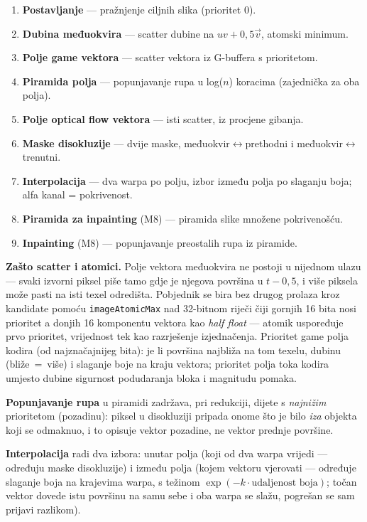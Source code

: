 \documentclass{mathos}
\begin{document}
\begin{enumerate}
\item \textbf{Postavljanje} — pražnjenje ciljnih slika (prioritet 0).
\item \textbf{Dubina međuokvira} — scatter dubine na $uv+0,5\vec v$, atomski minimum.
\item \textbf{Polje game vektora} — scatter vektora iz G-buffera s prioritetom.
\item \textbf{Piramida polja} — popunjavanje rupa u log($n$) koracima (zajednička za oba polja).
\item \textbf{Polje optical flow vektora} — isti scatter, iz procjene gibanja.
\item \textbf{Maske disokluzije} — dvije maske, međuokvir$\leftrightarrow$prethodni i međuokvir$\leftrightarrow$trenutni.
\item \textbf{Interpolacija} — dva warpa po polju, izbor između polja po slaganju boja; alfa kanal = pokrivenost.
\item \textbf{Piramida za inpainting} (M8) — piramida slike množene pokrivenošću.
\item \textbf{Inpainting} (M8) — popunjavanje preostalih rupa iz piramide.
\end{enumerate}

\textbf{Zašto scatter i atomici.} Polje vektora međuokvira ne postoji u
nijednom ulazu — svaki izvorni piksel piše tamo gdje je njegova površina u
$t-0,5$, i više piksela može pasti na isti texel odredišta. Pobjednik se bira
bez drugog prolaza kroz kandidate pomoću \verb+imageAtomicMax+ nad
32-bitnom riječi čiji gornjih 16 bita nosi prioritet a donjih 16 komponentu
vektora kao \emph{half float} — atomik uspoređuje prvo prioritet, vrijednost
tek kao razrješenje izjednačenja. Prioritet game polja kodira (od
najznačajnijeg bita): je li površina najbliža na tom texelu, dubinu
(bliže~=~više) i slaganje boje na kraju vektora; prioritet polja toka kodira
umjesto dubine sigurnost podudaranja bloka i magnitudu pomaka.

\textbf{Popunjavanje rupa} u piramidi zadržava, pri redukciji, dijete s
\emph{najnižim} prioritetom (pozadinu): piksel u disokluziji pripada onome
što je bilo \emph{iza} objekta koji se odmaknuo, i to opisuje vektor
pozadine, ne vektor prednje površine.

\textbf{Interpolacija} radi dva izbora: unutar polja (koji od dva warpa
vrijedi — određuju maske disokluzije) i između polja (kojem vektoru
vjerovati — određuje slaganje boja na krajevima warpa, s težinom
$\exp(-k\cdot\text{udaljenost boja})$; točan vektor dovede istu površinu na
samu sebe i oba warpa se slažu, pogrešan se sam prijavi razlikom).
\end{document}
